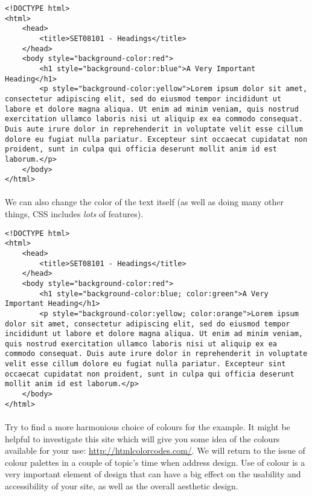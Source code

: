 \documentclass[10pt, a4paper, twosize]{article}
\begin{document}
\begin{lstlisting}
<!DOCTYPE html>
<html>
    <head>
        <title>SET08101 - Headings</title>
    </head>
    <body style="background-color:red">
        <h1 style="background-color:blue">A Very Important Heading</h1>
        <p style="background-color:yellow">Lorem ipsum dolor sit amet, consectetur adipiscing elit, sed do eiusmod tempor incididunt ut labore et dolore magna aliqua. Ut enim ad minim veniam, quis nostrud exercitation ullamco laboris nisi ut aliquip ex ea commodo consequat. Duis aute irure dolor in reprehenderit in voluptate velit esse cillum dolore eu fugiat nulla pariatur. Excepteur sint occaecat cupidatat non proident, sunt in culpa qui officia deserunt mollit anim id est laborum.</p>
    </body>
</html>
\end{lstlisting}

\paragraph{} We can also change the color of the text itself (as well as doing many other things, CSS includes \emph{lots} of features).

\begin{lstlisting}
<!DOCTYPE html>
<html>
    <head>
        <title>SET08101 - Headings</title>
    </head>
    <body style="background-color:red">
        <h1 style="background-color:blue; color:green">A Very Important Heading</h1>
        <p style="background-color:yellow; color:orange">Lorem ipsum dolor sit amet, consectetur adipiscing elit, sed do eiusmod tempor incididunt ut labore et dolore magna aliqua. Ut enim ad minim veniam, quis nostrud exercitation ullamco laboris nisi ut aliquip ex ea commodo consequat. Duis aute irure dolor in reprehenderit in voluptate velit esse cillum dolore eu fugiat nulla pariatur. Excepteur sint occaecat cupidatat non proident, sunt in culpa qui officia deserunt mollit anim id est laborum.</p>
    </body>
</html>
\end{lstlisting}

\paragraph{} Try to find a more harmonious choice of colours for the example. It might be helpful to investigate this site which will give you some idea of the colours available for your use: \url{http://htmlcolorcodes.com/}. We will return to the issue of colour palettes in a couple of topic's time when address design. Use of colour is a very important element of design that can have a big effect on the usability and accessibility of your site, as well as the overall aesthetic design.
\end{document}
